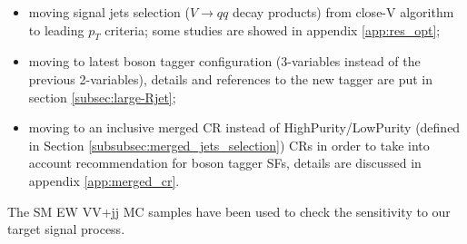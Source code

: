 \begin{itemize}
  \item moving signal jets selection ($V \rightarrow qq$ decay products) from close-V algorithm to leading $p_T$ criteria; some studies are showed in appendix \ref{app:res_opt};
  \item moving to latest boson tagger configuration (3-variables instead of the previous 2-variables), details and references to the new tagger are put in section \ref{subsec:large-Rjet};
  \item moving to an inclusive merged CR instead of HighPurity/LowPurity (defined in Section \ref{subsubsec:merged_jets_selection}) CRs in order to take into account recommendation for boson tagger SFs, details are discussed in appendix \ref{app:merged_cr}.
\end{itemize}

The SM EW VV+jj MC samples have been used to check the sensitivity to our target signal process.


%

%

%

%

%

%

%

%

%

